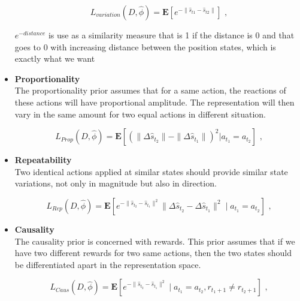 \documentclass[a4paper]{article}
\begin{document}
\begin{itemize}
\begin{equation}
L_{variation}(D,\hat{\phi})=\mathbf{E}[ e^{- \parallel \hat{s}_{t1}- \hat{s}_{t2}\parallel}] \mbox{ ,}
\label{equation_Prior_Variation}
\end{equation}

$e^{-distance}$ is use as  a  similarity  measure  that  is 1 if the  distance  is 0 and  that  goes  to 0 with  increasing  distance between the position states, which is exactly what we want

\item \textbf{Proportionality}\\
The proportionality prior assumes that for a same action, the reactions of these actions will have proportional amplitude. The representation will then vary in the same amount for two equal actions in different situation.

\begin{equation}
L_{Prop}(D,\hat{\phi})=\mathbf{E}[(\parallel\Delta\hat{s}_{t_2}\parallel-\parallel\Delta\hat{s}_{t_1}\parallel)^2 | a_{t_1}=a_{t_2}] \mbox{ ,}
\label{equation_Prior_Prop}
\end{equation}

\item \textbf{Repeatability}\\
Two identical actions applied at similar states should provide similar state variations, not only in magnitude but also in direction.

\begin{equation}
L_{Rep}(D,\hat{\phi})=\mathbf{E}[e^{-\parallel\hat{s}_{t_2}-\hat{s}_{t_1}\parallel^2}\parallel\Delta\hat{s}_{t_2}-\Delta\hat{s}_{t_1}\parallel^2 \mid a_{t_1}=a_{t_2}] \mbox{ ,}
\label{equation_Prior_Rep}
\end{equation}

\item \textbf{Causality}\\
The causality prior is concerned with rewards. This prior assumes that if we have two different rewards for two same actions, then the two states should be differentiated apart in the representation space.

\begin{equation}
L_{Caus}(D,\hat{\phi})=\mathbf{E}[ e^{-\parallel\hat{s}_{t_2}-\hat{s}_{t_1}\parallel^2} \mid a_{t_1}=a_{t_2},r_{t_1+1}\neq r_{t_2+1}] \mbox{ ,}
\label{equation_Prior_Caus}
\end{equation}


\end{itemize}
\end{document}
